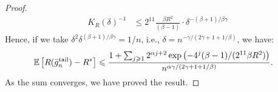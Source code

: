 \begin{proof}
\begin{align*}
K_R(\delta)^{-1} &\leqslant  2^{11}  \frac{\beta R ^2}{(\beta-1)}\cdot \delta^{-(\beta+1)/\beta\gamma}
\end{align*}
Hence, if we take $\delta^2 \delta^{(\beta+1)/\beta\gamma} = 1/n$, i.e., $\delta = n^{-\gamma/(2\gamma + 1+ 1/\beta) }$, we have:
\begin{align*}
{\mathbb E} \left[ R(\bar{g}_n^{\textrm {tail}}) - R^* \right] &\leqslant \frac{1+ \sum_{j \geqslant 1 }  2^{\alpha j + 2} \exp\left( - 4^{j} (\beta-1)/(2^{11}\beta R^2)\right)}{n^{\alpha\gamma/(2\gamma + 1+ 1/\beta) }}.
\end{align*}
As the sum converges, we have proved the result.

\end{proof}




%
%
%
%
%
%
%
%
%
%
%
%
%
%
%
%
%
%
%
%
%
%
%
%
%
%
%










